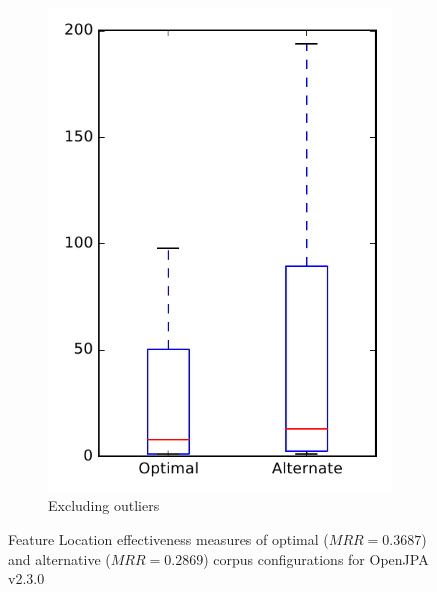 \begin{figure}
\begin{subfigure}{.4\textwidth}
        \includegraphics[height=0.4\textheight]{figures/combo/flt_rq2_openjpa_no_outlier}
        \caption{Excluding outliers}\label{fig:combo:flt:rq2:openjpa_no_outlier}
    \end{subfigure}
\caption[Feature Location effectiveness measures of optimal and alternative corpus configurations for OpenJPA v2.3.0]%
{Feature Location effectiveness measures of optimal ($MRR=0.3687$) and alternative ($MRR=0.2869$) corpus configurations for OpenJPA v2.3.0}
\label{fig:combo:flt:rq2:openjpa}
\end{figure}
